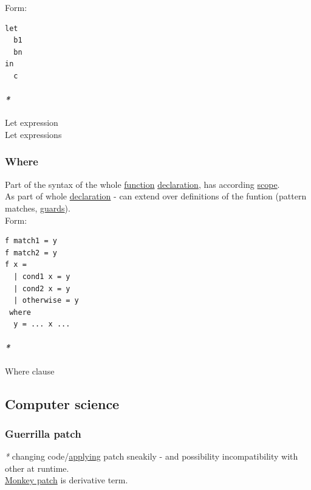 \documentclass[11pt]{article}
\begin{document}
Form:\\
\begin{verbatim}
let
  b1
  bn
in
  c
\end{verbatim}

\paragraph{\emph{*}}
\label{sec:org2c5f2eb}

\label{orgee1c410}Let expression\\
\label{org7da5e7a}Let expressions\\

\subsubsection{\label{org3e5903d}Where}
\label{sec:org7bc0f95}
Part of the syntax of the whole \hyperref[orge15bc14]{function} \hyperref[org8fbd848]{declaration}, has according \hyperref[orgb3c0d1a]{scope}.\\

As part of whole \hyperref[org8fbd848]{declaration} - can extend over definitions of the funtion (pattern matches, \hyperref[orgc6782d2]{guards}).\\

Form:\\
\begin{verbatim}
f match1 = y
f match2 = y
f x =
  | cond1 x = y
  | cond2 x = y
  | otherwise = y
 where
  y = ... x ...
\end{verbatim}

\paragraph{\emph{*}}
\label{sec:orgea25edd}

\label{orgf9d3798}Where clause\\

\subsection{Computer science}
\label{sec:org192edef}
\subsubsection{\label{org9398c24}Guerrilla patch}
\label{sec:org560191d}
\emph{*} changing code/\hyperref[org6b37c0b]{applying} patch sneakily - and possibility incompatibility with other at runtime.\\
\hyperref[org68cde61]{Monkey patch} is derivative term.\\
\end{document}
